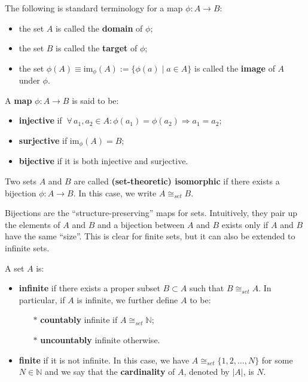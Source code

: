 \documentclass[root.tex]{subfiles}
\begin{document}
The following is standard terminology for a map $\phi : A \to B$:
\begin{itemize}
  \item the set $A$ is called the \textbf{domain} of $\phi$;
\item the set $B$ is called the \textbf{target} of $\phi$;
\item the set $\phi(A) \equiv \text{im}_\phi(A) := \{\phi(a) \mid a \in A\}$ is called the \textbf{image} of $A$ under $\phi$.
\end{itemize}

\begin{mydef}
A \textbf{map} $\phi : A \to B$ is said to be:
\begin{itemize}
  \item \textbf{injective} if $\ \forall \, a_1,a_2 \in A : \phi(a_1)=\phi(a_2) \Rightarrow a_1 = a_2$;
\item \textbf{surjective} if $\text{im}_\phi(A) = B$;
\item \textbf{bijective} if it is both injective and surjective.
\end{itemize}
\end{mydef}

\begin{mydef}
  Two sets $A$ and $B$ are called \textbf{(set-theoretic) isomorphic} if there exists a bijection $\phi : A \to B$. In this case, we write $A \cong_{set} B$.
\end{mydef}

Bijections are the ``structure-preserving'' maps for sets. Intuitively, they pair up the elements of $A$ and $B$ and a bijection between $A$ and $B$ exists only if $A$ and $B$ have the same ``size''. This is clear for finite sets, but it can also be extended to infinite sets.\\


\begin{mydef}
A set $A$ is:
\begin{itemize}
  \item \textbf{infinite} if there exists a proper subset $B\subset A$ such that $B \cong_{set} A$. In particular, if $A$ is infinite, we further define $A$ to be:
\begin{itemize}
  \item[$*$] \textbf{countably} infinite if $A \cong_{set} \mathbb{N}$;
\item[$*$] \textbf{uncountably} infinite otherwise.
\end{itemize}
\item \textbf{finite} if it is not infinite. In this case, we have $A \cong_{set} \{1,2,\ldots,N\}$ for some $N \in \mathbb{N}$ and we say that the \textbf{cardinality} of $A$, denoted by $|A|$, is $N$.
\end{itemize}
\end{mydef}
\end{document}
